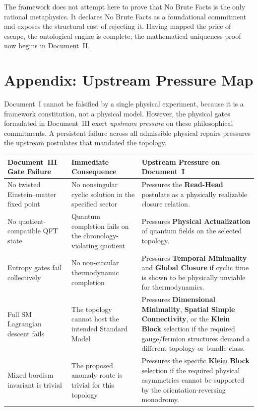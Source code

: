 \documentclass[11pt]{article}
\theoremstyle{canonstyle}
\begin{document}
The framework does not attempt here to prove that No Brute Facts is the only rational metaphysics. It declares No Brute Facts as a foundational commitment and exposes the structural cost of rejecting it. Having mapped the price of escape, the ontological engine is complete; the mathematical uniqueness proof now begins in Document~II.

\newpage
\section*{Appendix: Upstream Pressure Map}
{}

Document~I cannot be falsified by a single physical experiment, because it is a framework constitution, not a physical model. However, the physical gates formulated in Document~III exert \emph{upstream pressure} on these philosophical commitments. A persistent failure across all admissible physical repairs pressures the upstream postulates that mandated the topology.

\begin{center}
\small
\begin{tabularx}{\textwidth}{@{}>{\raggedright\arraybackslash}p{4.2cm} >{\raggedright\arraybackslash}p{4.2cm} X@{}}
\toprule
\textbf{Document~III Gate Failure} & \textbf{Immediate Consequence} & \textbf{Upstream Pressure on Document~I} \\
\midrule
No twisted Einstein--matter fixed point & No nonsingular cyclic solution in the specified sector & Pressures the \textbf{Read-Head} postulate as a physically realizable closure relation. \\
No quotient-compatible QFT state & Quantum completion fails on the chronology-violating quotient & Pressures \textbf{Physical Actualization} of quantum fields on the selected topology. \\
Entropy gates fail collectively & No non-circular thermodynamic completion & Pressures \textbf{Temporal Minimality} and \textbf{Global Closure} if cyclic time is shown to be physically unviable for thermodynamics. \\
Full SM Lagrangian descent fails & The topology cannot host the intended Standard Model & Pressures \textbf{Dimensional Minimality}, \textbf{Spatial Simple Connectivity}, or the \textbf{Klein Block} selection if the required gauge/fermion structures demand a different topology or bundle class. \\
Mixed bordism invariant is trivial & The proposed anomaly route is trivial for this topology & Pressures the specific \textbf{Klein Block} selection if the required physical asymmetries cannot be supported by the orientation-reversing monodromy. \\
\bottomrule
\end{tabularx}
\end{center}
\end{document}
